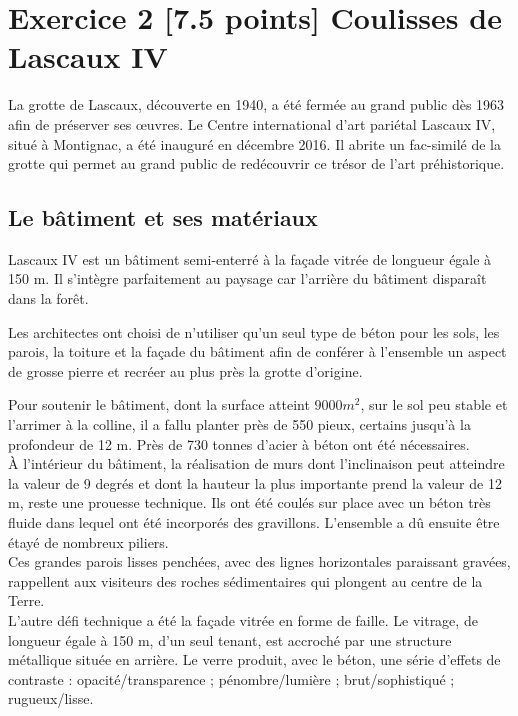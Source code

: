 \documentclass{exam}
\begin{document}
\section*{Exercice 2 [7.5 points] Coulisses de Lascaux IV}

La grotte de Lascaux, découverte en 1940, a été fermée au grand public dès 1963 afin de préserver ses œuvres.  
Le Centre international d'art pariétal Lascaux IV, situé à Montignac, a été inauguré en décembre 2016.  
Il abrite un fac-similé de la grotte qui permet au grand public de redécouvrir ce trésor de l'art préhistorique.  

\subsection*{Le bâtiment et ses matériaux}

Lascaux IV est un bâtiment semi-enterré à la façade vitrée de longueur égale à 150 m.  
Il s'intègre parfaitement au paysage car l'arrière du bâtiment disparaît dans la forêt. \par
\vspace{1em}

Les architectes ont choisi de n'utiliser qu'un seul type de béton pour les sols, les parois, la toiture et la façade du bâtiment
afin de conférer à l'ensemble un aspect de grosse pierre et recréer au plus près la grotte d'origine.


\begin{tcolorbox}[colback=white, colframe=gray, coltitle=black, title=\textbf{Document 1 - Un chantier complexe}]
  Pour soutenir le bâtiment, dont la surface atteint $9000 m^2$, sur le sol peu stable et l'arrimer à la colline, il a fallu planter près de 550 pieux, certains jusqu'à la profondeur de 12 m.
  Près de 730 tonnes d'acier à béton ont été nécessaires. \\
  
  À l'intérieur du bâtiment, la réalisation de murs dont l'inclinaison peut atteindre la valeur de 9 degrés et dont la hauteur la plus importante prend la valeur de 12 m, reste une prouesse technique.
  Ils ont été coulés sur place avec un béton très fluide dans lequel ont été incorporés des gravillons.
  L'ensemble a dû ensuite être étayé de nombreux piliers. \\
  
  Ces grandes parois lisses penchées, avec des lignes horizontales paraissant gravées, rappellent aux visiteurs des roches sédimentaires qui plongent au centre de la Terre. \\

  L'autre défi technique a été la façade vitrée en forme de faille. Le vitrage, de longueur égale à 150 m, d'un seul tenant, est accroché par une structure métallique située en arrière.
  Le verre produit, avec le béton, une série d'effets de contraste : opacité/transparence ; pénombre/lumière ; brut/sophistiqué ; rugueux/lisse.
  \end{tcolorbox}
\end{document}

